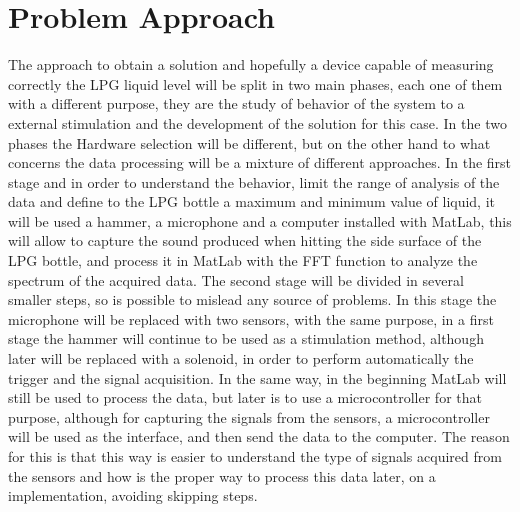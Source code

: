 \section{Problem Approach}
The approach to obtain a solution and hopefully a device capable of measuring correctly the LPG liquid level will be split in two main phases, each one of them with a different purpose, they are the study of behavior of the system to a external stimulation and the development of the solution for this case. In the two phases the Hardware selection will be different, but on the other hand to what concerns the data processing will be a mixture of different approaches.
In the first stage and in order to understand the behavior, limit the range of analysis of the data and define to the LPG bottle a maximum and minimum value of liquid, it will be used a hammer, a microphone and a computer installed with MatLab, this will allow to capture the sound produced when hitting the side surface of the LPG bottle, and process it in MatLab with the FFT function to analyze the spectrum of the acquired data.
The second stage will be divided in several smaller steps, so is possible to mislead any source of problems. In this stage the microphone will be replaced with two sensors, with the same purpose, in a first stage the hammer will continue to be used as a stimulation method, although later will be replaced with a solenoid, in order to perform automatically the trigger and the signal acquisition. In the same way, in the beginning MatLab will still be used to process the data, but later is to use a microcontroller for that purpose, although for capturing the signals from the sensors, a microcontroller will be used as the interface, and then send the data to the computer. The reason for this is that this way is easier to understand the type of signals acquired from the sensors and how is the proper way to process this data later, on a implementation, avoiding skipping steps.

\clearpage
